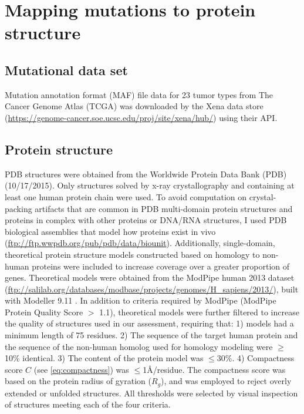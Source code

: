 \section{Mapping mutations to protein structure}

\subsection{Mutational data set}

Mutation annotation format (MAF) file data for 23 tumor types from The Cancer Genome Atlas (TCGA) was downloaded by the Xena data store (\url{https://genome-cancer.soe.ucsc.edu/proj/site/xena/hub/}) using their API.

\subsection{Protein structure}

PDB structures were obtained from the Worldwide Protein Data Bank (PDB) (10/17/2015). Only structures solved by x-ray crystallography and containing at least one human protein chain were used.  To avoid computation on crystal-packing artifacts that are common in PDB multi-domain protein structures and proteins in complex with other proteins or DNA/RNA structures, I used PDB biological assemblies that model how proteins exist in vivo (\url{ftp://ftp.wwpdb.org/pub/pdb/data/biounit}). Additionally, single-domain, theoretical protein structure models constructed based on homology to non-human proteins were included to increase coverage over a greater proportion of genes. Theoretical models were obtained from the ModPipe human 2013 dataset (\url{ftp://salilab.org/databases/modbase/projects/genomes/H_sapiens/2013/}), built with Modeller 9.11 \cite{RN119}.   In addition to criteria required by ModPipe (ModPipe Protein Quality Score $>$ 1.1), theoretical models were further filtered to increase the quality of structures used in our assessment, requiring that: 1) models had a minimum length of 75 residues. 2) The sequence of the target human protein and the sequence of the non-human homolog used for homology modeling were $\geq$10\% identical. 3) The  content of the protein model was $\leq$30\%. 4) Compactness score $C$ (see \autoref{eq:compactness}) was $\leq$1\AA/residue. The compactness score was based on the protein radius of gyration ($R_g$), and was employed to reject overly extended or unfolded structures. All thresholds were selected by visual inspection of structures meeting each of the four criteria.

